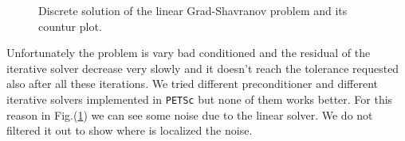 \begin{figure}
\caption{Discrete solution of the linear Grad-Shavranov problem and its countur plot.}\label{fig:gs_linear_mod}
\end{figure}

Unfortunately the problem is vary bad conditioned and the residual of the iterative solver decrease very slowly and it doesn't reach the tolerance requested also after all these iterations. We tried different preconditioner and different iterative solvers implemented in \verb|PETSc| but none of them works better. For this reason in Fig.(\ref{fig:gs_linear_mod}) we can see some noise due to the linear solver. We do not filtered it out to show where is localized the noise.

